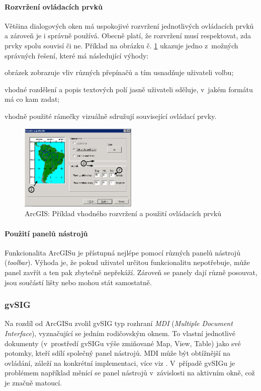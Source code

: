 \documentclass[a4paper,12pt,draft]{article}
\begin{document}
\paragraph*{Rozvržení ovládacích prvků}
Většina dialogových oken má uspokojivé rozvržení jednotlivých
ovládacích prvků a zároveň je i správně používá. Obecně platí,
že rozvržení musí respektovat, zda prvky spolu souvisí či ne. Příklad
na obrázku č. \ref{fig:ArcGIS_graticule_wizard} ukazuje jedno z~možných
správných řešení, které má následující výhody:
\begin{inparaenum}[\itshape 1\upshape)]
\item obrázek zobrazuje vliv různých přepínačů a tím usnadňuje
uživateli volbu;
\item vhodné roz\-dělení a popis textových polí jasně uživateli sděluje,
v~jakém formátu má co kam zadat;
\item vhodně použité rámečky vizuálně sdružují související
ovládací prvky.
\end{inparaenum}


\begin{figure}[h!]
\centering
\includegraphics[width=0.5\textwidth]{./GUI_screenshots/ArcGIS_graticule_wizard.png}
\caption{ArcGIS: Příklad vhodného rozvržení a použití ovládacích
prvků}
\label{fig:ArcGIS_graticule_wizard}
\end{figure}

\paragraph*{Použití panelů nástrojů}
Funkcionalita ArcGISu je přístupná nejlépe pomocí různých panelů
nástrojů (\emph{toolbar}). Výhoda je, že pokud uživatel určitou
funkcionalitu nepotřebuje, může panel zavřít a ten pak zbytečně
nepřekáží. Zároveň se panely dají různě posouvat, jsou součástí
lišty nebo mohou stát samostatně.






\subsubsection{gvSIG}
Na rozdíl od ArcGISu zvolil gvSIG typ rozhraní \emph{MDI} (\emph{Multiple
Document Interface}),  vyznačující se jedním rodičovským oknem. To vlastní
jednotlivé dokumenty (v~prostředí gvSIGu výše zmiňované Map, View, Table) jako
své potomky, kteří sdílí společný panel nástrojů. MDI může být obtížnější na
ovládání, záleží na konkrétní implementaci, více viz \cite{wiki_MDI}. V~případě
gvSIGu je problémem například  měnící se panel nástrojů v~závislosti na aktivním
okně, což je značně matoucí.
\end{document}
